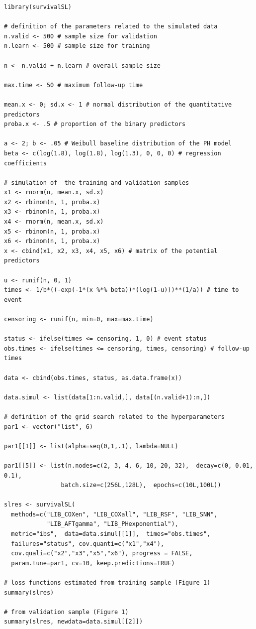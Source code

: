 \begin{verbatim}
library(survivalSL)

# definition of the parameters related to the simulated data
n.valid <- 500 # sample size for validation
n.learn <- 500 # sample size for training

n <- n.valid + n.learn # overall sample size

max.time <- 50 # maximum follow-up time

mean.x <- 0; sd.x <- 1 # normal distribution of the quantitative predictors
proba.x <- .5 # proportion of the binary predictors

a <- 2; b <- .05 # Weibull baseline distribution of the PH model
beta <- c(log(1.8), log(1.8), log(1.3), 0, 0, 0) # regression coefficients

# simulation of  the training and validation samples
x1 <- rnorm(n, mean.x, sd.x)
x2 <- rbinom(n, 1, proba.x)
x3 <- rbinom(n, 1, proba.x)
x4 <- rnorm(n, mean.x, sd.x)
x5 <- rbinom(n, 1, proba.x)
x6 <- rbinom(n, 1, proba.x)
x <- cbind(x1, x2, x3, x4, x5, x6) # matrix of the potential predictors
  
u <- runif(n, 0, 1)
times <- 1/b*((-exp(-1*(x %*% beta))*(log(1-u)))**(1/a)) # time to event
  
censoring <- runif(n, min=0, max=max.time)
  
status <- ifelse(times <= censoring, 1, 0) # event status
obs.times <- ifelse(times <= censoring, times, censoring) # follow-up times
  
data <- cbind(obs.times, status, as.data.frame(x))
  
data.simul <- list(data[1:n.valid,], data[(n.valid+1):n,])

# definition of the grid search related to the hyperparameters
par1 <- vector("list", 6)

par1[[1]] <- list(alpha=seq(0,1,.1), lambda=NULL)

par1[[5]] <- list(n.nodes=c(2, 3, 4, 6, 10, 20, 32),  decay=c(0, 0.01, 0.1),
                batch.size=c(256L,128L),  epochs=c(10L,100L))

slres <- survivalSL(
  methods=c("LIB_COXen", "LIB_COXall", "LIB_RSF", "LIB_SNN",
            "LIB_AFTgamma", "LIB_PHexponential"),
  metric="ibs",  data=data.simul[[1]],  times="obs.times",
  failures="status", cov.quanti=c("x1","x4"),
  cov.quali=c("x2","x3","x5","x6"), progress = FALSE,
  param.tune=par1, cv=10, keep.predictions=TRUE)

# loss functions estimated from training sample (Figure 1)
summary(slres) 

# from validation sample (Figure 1)
summary(slres, newdata=data.simul[[2]]) 
\end{verbatim}

